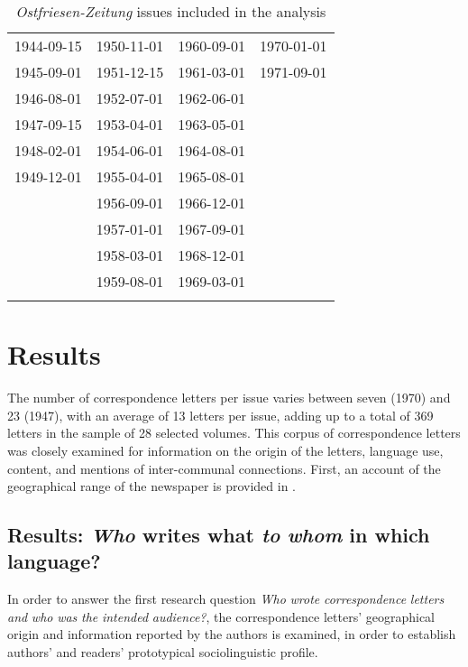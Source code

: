 \documentclass[output=paper]{langsci/langscibook}
\begin{document}
\begin{table} 
\begin{tabular}{llll}
\lsptoprule
\multicolumn{4}{c}{Volume by date} \\
\midrule
1944-09-15 & 1950-11-01 & 1960-09-01 & 1970-01-01\\
1945-09-01 & 1951-12-15 & 1961-03-01 & 1971-09-01\\
1946-08-01 & 1952-07-01 & 1962-06-01 & \\
1947-09-15 & 1953-04-01 & 1963-05-01 & \\
1948-02-01 & 1954-06-01 & 1964-08-01 & \\
1949-12-01 & 1955-04-01 & 1965-08-01 & \\
 & 1956-09-01 & 1966-12-01 & \\
 & 1957-01-01 & 1967-09-01 & \\
 & 1958-03-01 & 1968-12-01 & \\
 & 1959-08-01 & 1969-03-01 & \\
\lspbottomrule
\end{tabular}
\caption{\textit{Ostfriesen-Zeitung} issues included in the analysis\label{tab:rocker:1}}
\end{table}



\section{Results} %
\label{sec:rocker:4}

The number of correspondence letters per issue varies between seven (1970) and 23 (1947), with an average of 13 letters per issue, adding up to a total of 369 letters in the sample of 28 selected volumes. This corpus of correspondence letters was closely examined for information on the origin of the letters, language use, content, and mentions of inter-communal connections. First, an account of the geographical range of the newspaper is provided in .

\subsection{Results: \textit{Who} writes what \textit{to} \textit{whom} in which language?} %
\label{sec:rocker:4.1}

In order to answer the first research question \textit{Who} \textit{wrote} \textit{correspondence} \textit{letters} \textit{and} \textit{who} \textit{was} \textit{the} \textit{intended} \textit{audience?}, the correspondence letters’ geographical origin and information reported by the authors is examined, in order to establish authors’ and readers’ prototypical sociolinguistic profile.
\end{document}
